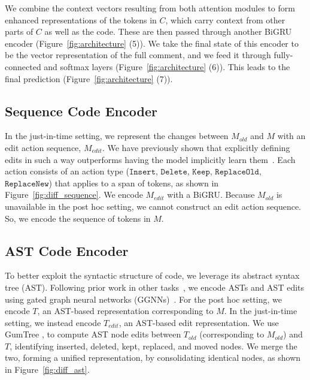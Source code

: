 \documentclass[letterpaper]{article} %
\newcommand{\CodeIn}[1]{{\ifmmode{\mathtt{#1}}\else$\mathtt{#1}$\fi}}
\newcommand{\Comment}{$C$}
\newcommand{\OldCode}{$M_{old}$}
\newcommand{\NewCode}{$M$}
\newcommand{\Posthoc}{post hoc}
\newcommand{\JustInTime}{just-in-time}
\newcommand{\EditCode}{$M_{edit}$}
\newcommand{\NewTree}{$T$}
\newcommand{\OldTree}{$T_{old}$}
\newcommand{\EditTree}{$T_{edit}$}
\begin{document}
We combine the context vectors resulting from both attention modules to form enhanced representations of the tokens in \Comment{}, which carry context from other parts of \Comment{} as well as the code. These are then passed through another BiGRU encoder (Figure~\ref{fig:architecture} (5)). We take the final state of this encoder to be the vector representation of the full comment, and we feed it through fully-connected and softmax layers (Figure~\ref{fig:architecture} (6)). This leads to the final prediction (Figure~\ref{fig:architecture} (7)).

\subsection{Sequence Code Encoder}
\label{sec:sequence-code-encoder}
In the \JustInTime{} setting, we represent the changes between \OldCode{} and \NewCode{} with an edit action sequence, \EditCode{}. We have previously shown that explicitly defining edits in such a way outperforms having the model implicitly learn them~\cite{panthaplackel2020update}. Each action consists of an action type (\CodeIn{Insert}, \CodeIn{Delete}, \CodeIn{Keep}, \CodeIn{ReplaceOld}, \CodeIn{ReplaceNew}) that applies to a span of tokens, as shown in Figure~\ref{fig:diff_sequence}. We encode \EditCode{} with a BiGRU. Because \OldCode{} is unavailable in the \Posthoc{} setting, we cannot construct an edit action sequence. So, we encode the sequence of tokens in \NewCode{}.

\subsection{AST Code Encoder}
\label{sec:ast-code-encoder}
To better exploit the syntactic structure of code, we leverage its abstract syntax tree (AST). Following prior work in other tasks~\cite{FernandesSummarization, yin19iclr}, we encode ASTs and AST edits using gated graph neural networks (GGNNs)~\cite{Li2016GatedGS}. For the \Posthoc{} setting, we encode \NewTree{}, an AST-based representation corresponding to \NewCode{}. In the \JustInTime{} setting, we instead encode \EditTree{}, an AST-based edit representation. We use GumTree \cite{GumTree}, to compute AST node edits between \OldTree{} (corresponding to \OldCode{}) and \NewTree{}, identifying inserted, deleted, kept, replaced, and moved nodes. We merge the two, forming a unified representation, by consolidating identical nodes, as shown in Figure~\ref{fig:diff_ast}.
\end{document}
